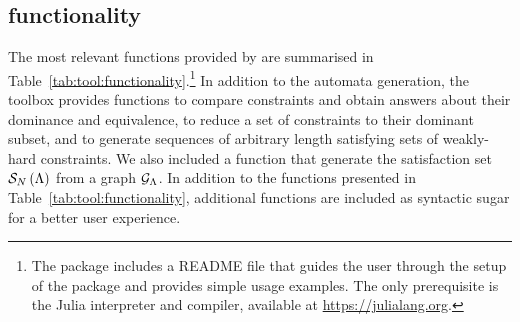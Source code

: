 \subsection{\tool{} functionality}%
\label{sec:tool:functionality}%
%

%
The most relevant functions provided by \tool{} are summarised in Table~\ref{tab:tool:functionality}.\footnote{The package includes a README file that guides the user through the setup of the package and provides simple usage examples. The only prerequisite is the Julia interpreter and compiler, available at \url{https://julialang.org}.}
In addition to the automata generation, the toolbox provides functions to compare constraints and obtain answers about their dominance and equivalence, to reduce a set of constraints to their dominant subset, and to generate sequences of arbitrary length satisfying sets of weakly-hard constraints.
We also included a function that generate the satisfaction set $\mathcal{S}_{N}\left( \Lambda \right)$ from a graph $\mathcal{G}_{\Lambda}$.
In addition to the functions presented in Table~\ref{tab:tool:functionality}, additional functions are included as syntactic sugar for a better user experience.

